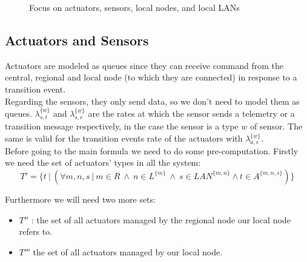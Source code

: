 \documentclass[11pt]{article}
\begin{document}
\begin{figure}[H]
	\centering
	\frame{}
	\caption{Focus on actuators, sensors,  local nodes, and local LANs}
\end{figure}

\subsection{Actuators and Sensors}
Actuators are modeled as queues since they can receive command from the central, regional and local node (to which they are connected) in response to a transition event.\\
Regarding the sensors, they only send data, so we don't need to model them as queues. $\lambda^{\{w\}}_{s,t}$ and $\lambda^{\{w\}}_{s,e}$ are the rates at which the sensor sends a telemetry or a transition message respectively, in the case the sensor is a type $w$ of sensor. The same is valid for the transition events rate of the actuators with $\lambda^{\{w\}}_{a,e}$.\\


Before going to the main formula we need to do some pre-computation. Firstly we need the set of actuators' types in all the system:
\begin{equation}
    T' = \{ t \ | \ (\forall m,n,s \ | \ m \in R \ \land \ n \in L^{\{m\}} \ \land \ s \in LAN^{\{m, n\}} \land t \in A^{\{m,n,s\}}) \}
\end{equation}

Furthermore we will need two more sets:
\begin{itemize}
\item $T''$ : the set of all actuators managed by the regional node our local node refers to.
\item $T'''$ the set of all actuators managed by our local node.
\end{itemize}
\end{document}
